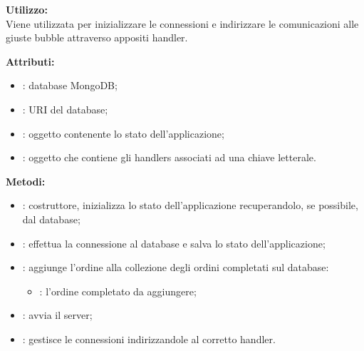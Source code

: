 \textbf{Utilizzo:}\\
Viene utilizzata per inizializzare le connessioni e indirizzare le comunicazioni alle giuste bubble attraverso appositi handler.

%

\textbf{Attributi:}
\begin{itemize}
	\item {}: database MongoDB;
	\item {}: URI del database;
	\item {}: oggetto contenente lo stato dell'applicazione;
	\item {}: oggetto che contiene gli handlers associati ad una chiave letterale.
\end{itemize}

\textbf{Metodi:}
\begin{itemize}
	\item {}: costruttore, inizializza lo stato dell'applicazione recuperandolo, se possibile, dal database;
	\item {}: effettua la connessione al database e salva lo stato dell'applicazione;
	\item {}: aggiunge l'ordine alla collezione degli ordini completati sul database:
	\begin{itemize}
		\item {}: l'ordine completato da aggiungere;
	\end{itemize}
	\item {}: avvia il server;
	\item {}: gestisce le connessioni indirizzandole al corretto handler.
\end{itemize}

